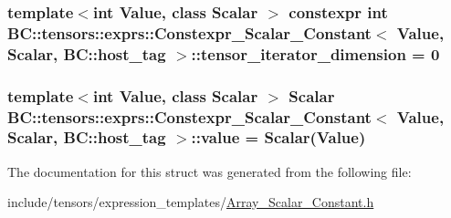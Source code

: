 \subsubsection[{\texorpdfstring{tensor\+\_\+iterator\+\_\+dimension}{tensor_iterator_dimension}}]{\setlength{\rightskip}{0pt plus 5cm}template$<$int Value, class Scalar $>$ constexpr int {\bf B\+C\+::tensors\+::exprs\+::\+Constexpr\+\_\+\+Scalar\+\_\+\+Constant}$<$ Value, {\bf Scalar}, {\bf B\+C\+::host\+\_\+tag} $>$\+::tensor\+\_\+iterator\+\_\+dimension = 0\hspace{0.3cm}{\ttfamily [static]}}\hypertarget{structBC_1_1tensors_1_1exprs_1_1Constexpr__Scalar__Constant_3_01Value_00_01Scalar_00_01BC_1_1host__tag_01_4_a200821c3055af0e6276199660bd60014}{}\label{structBC_1_1tensors_1_1exprs_1_1Constexpr__Scalar__Constant_3_01Value_00_01Scalar_00_01BC_1_1host__tag_01_4_a200821c3055af0e6276199660bd60014}
\subsubsection[{\texorpdfstring{value}{value}}]{\setlength{\rightskip}{0pt plus 5cm}template$<$int Value, class Scalar $>$ {\bf Scalar} {\bf B\+C\+::tensors\+::exprs\+::\+Constexpr\+\_\+\+Scalar\+\_\+\+Constant}$<$ Value, {\bf Scalar}, {\bf B\+C\+::host\+\_\+tag} $>$\+::value = {\bf Scalar}(Value)}\hypertarget{structBC_1_1tensors_1_1exprs_1_1Constexpr__Scalar__Constant_3_01Value_00_01Scalar_00_01BC_1_1host__tag_01_4_a462b84955d06631b0ec510917c8b8cc3}{}\label{structBC_1_1tensors_1_1exprs_1_1Constexpr__Scalar__Constant_3_01Value_00_01Scalar_00_01BC_1_1host__tag_01_4_a462b84955d06631b0ec510917c8b8cc3}


The documentation for this struct was generated from the following file\+:\begin{DoxyCompactItemize}
\item 
include/tensors/expression\+\_\+templates/\hyperlink{Array__Scalar__Constant_8h}{Array\+\_\+\+Scalar\+\_\+\+Constant.\+h}\end{DoxyCompactItemize}
